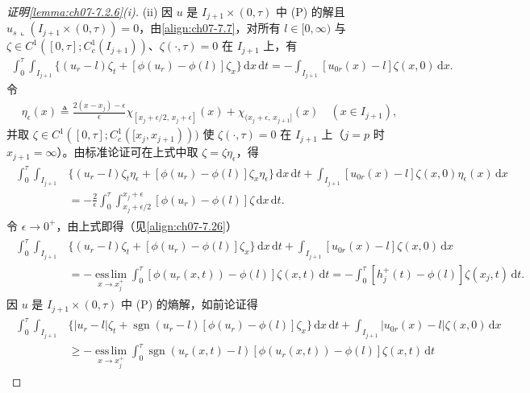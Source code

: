 \documentclass[../../main.tex]{subfiles}%
\begin{document}
\begin{proof}[证明\cref{lemma:ch07-7.2.6}(i)]
(ii) 因 $u$ 是 $I_{j+1}\times(0,\tau)$ 中 (P) 的解且 $u_s\llcorner(I_{j+1}\times(0,\tau))=0$，由\eqref{align:ch07-7.7}，对所有 $l\in[0,\infty)$ 与 $\zeta\in C^1([0,\tau];C^1_c(I_{j+1}))$、$\zeta(\cdot,\tau)=0$ 在 $I_{j+1}$ 上，有
\begin{align*}
\int_0^\tau\int_{I_{j+1}}\{(u_r-l)\zeta_t+[\phi(u_r)-\phi(l)]\zeta_x\}\,\mathrm{d}x\,\mathrm{d}t
=-\int_{I_{j+1}}[u_{0r}(x)-l]\zeta(x,0)\,\mathrm{d}x.
\end{align*}
令
\begin{align}
\eta_\epsilon(x)\triangleq \frac{2(x-x_j)-\epsilon}{\epsilon}\chi_{[x_j+\epsilon/2,\,x_j+\epsilon]}(x)+\chi_{(x_j+\epsilon,\,x_{j+1}]}(x)
\quad(x\in I_{j+1}), \label{align:ch07-7.27}
\end{align}
并取 $\zeta\in C^1([0,\tau];C^1_c([x_j,x_{j+1})))$ 使 $\zeta(\cdot,\tau)=0$ 在 $I_{j+1}$ 上（$j=p$ 时 $x_{j+1}=\infty$）。由标准论证可在上式中取 $\zeta=\zeta\eta_\epsilon$，得
\begin{align*}
\begin{aligned}
\int_0^\tau\int_{I_{j+1}}&\{(u_r-l)\zeta_t\eta_\epsilon+[\phi(u_r)-\phi(l)]\zeta_x\eta_\epsilon\}\,\mathrm{d}x\,\mathrm{d}t
+\int_{I_{j+1}}[u_{0r}(x)-l]\zeta(x,0)\eta_\epsilon(x)\,\mathrm{d}x\\
&=-\frac{2}{\epsilon}\int_0^\tau\int_{x_j+\epsilon/2}^{x_j+\epsilon}[\phi(u_r)-\phi(l)]\zeta\,\mathrm{d}x\,\mathrm{d}t.
\end{aligned}
\end{align*}
令 $\epsilon\to0^+$，由上式即得（见\eqref{align:ch07-7.26}）
\begin{align}
\begin{aligned}
\int_0^\tau\int_{I_{j+1}}&\{(u_r-l)\zeta_t+[\phi(u_r)-\phi(l)]\zeta_x\}\,\mathrm{d}x\,\mathrm{d}t
+\int_{I_{j+1}}[u_{0r}(x)-l]\zeta(x,0)\,\mathrm{d}x\\
&=-\operatorname*{ess\,lim}_{x\to x_j^+}\int_0^\tau[\phi(u_r(x,t))-\phi(l)]\zeta(x,t)\,\mathrm{d}t
=-\int_0^\tau[h_j^+(t)-\phi(l)]\zeta(x_j,t)\,\mathrm{d}t.
\end{aligned} \label{align:ch07-7.28}
\end{align}
因 $u$ 是 $I_{j+1}\times(0,\tau)$ 中 (P) 的熵解，如前论证得
\begin{align*}
\begin{aligned}
\int_0^\tau\int_{I_{j+1}}&\{|u_r-l|\zeta_t+\operatorname{sgn}(u_r-l)[\phi(u_r)-\phi(l)]\zeta_x\}\,\mathrm{d}x\,\mathrm{d}t
+\int_{I_{j+1}}|u_{0r}(x)-l|\zeta(x,0)\,\mathrm{d}x\\
&\geqslant-\operatorname*{ess\,lim}_{x\to x_j^+}\int_0^\tau\operatorname{sgn}(u_r(x,t)-l)[\phi(u_r(x,t))-\phi(l)]\zeta(x,t)\,\mathrm{d}t

\end{aligned}
\end{align*}
\end{proof}
\end{document}
